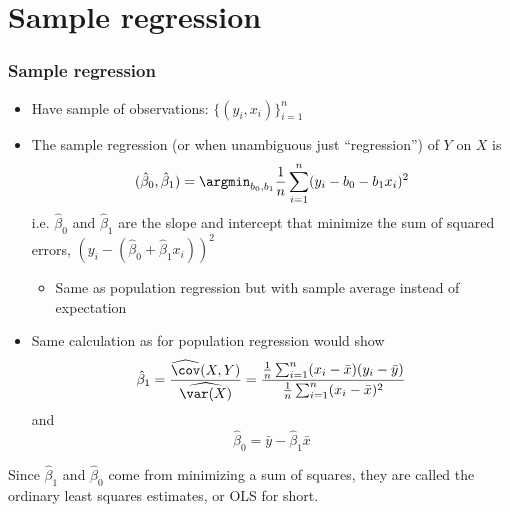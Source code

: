 \section{Sample regression}
\begin{frame} \frametitle{Sample regression}
  \begin{itemize}
  \item Have sample of observations: $\{ (y_i, x_i) \}_{i=1}^n$ 
  \item The \alert{sample regression} (or when unambiguous just
    ``regression'') of $Y$ on $X$ is 
    \[ (\hat{\beta}_0, \hat{\beta}_1) = \argmin_{b_0,b_1}
    \frac{1}{n}\sum_{i=1}^n (y_i - b_0 - b_1 x_i)^2 \] 
    i.e. $\hat{\beta}_0$ and $\hat{\beta}_1$ are the slope and intercept that
    minimize the sum of squared errors, $(y_i - (\hat{\beta}_0 + \hat{\beta}_1 x_i))^2$ 
    \begin{itemize}
    \item Same as population regression but with sample average
      instead of expectation
    \end{itemize}
  \item Same calculation as for population regression would show
    \[ \hat{\beta}_1 = \frac{\widehat{\cov}(X,Y)}{\widehat{\var(X)}} =
    \frac{\frac{1}{n} \sum_{i=1}^n (x_i -\bar{x})(y_i - \bar{y})}
    {\frac{1}{n} \sum_{i=1}^n (x_i - \bar{x})^2} \]
    and 
    \[ \hat{\beta}_0 = \bar{y} - \hat{\beta}_1 \bar{x} \]
  \end{itemize}
\end{frame}

Since $\hat{\beta}_1$ and $\hat{\beta}_0$ come from minimizing a sum
of squares, they are called the ordinary least squares estimates, or
OLS for short. 

